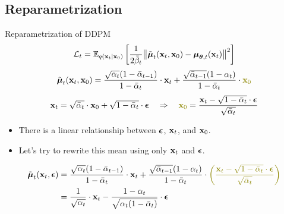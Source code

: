 \documentclass{beamer}
\begin{document}
\subsection{Reparametrization}
\begin{frame}{Reparametrization of DDPM}
    \[
        \mathcal{L}_t = \mathbb{E}_{q(\mathbf{x}_t | \mathbf{x}_0)} \left[\frac{1}{2\tilde{\beta}_t} \bigl\| \tilde{\boldsymbol{\mu}}_t(\mathbf{x}_t, \mathbf{x}_0) - \boldsymbol{\mu}_{\boldsymbol{\theta}, t}(\mathbf{x}_t) \bigr\|^2  \right]
    \]
    \[
        \tilde{\bmu}_t(\bx_t, \bx_0) = \frac{\sqrt{\alpha_t}(1 - \bar{\alpha}_{t-1})}{1 - \bar{\alpha}_t} \cdot \bx_t + \frac{\sqrt{\bar{\alpha}_{t-1}}(1 - \alpha_t)}{1 - \bar{\alpha}_t} \cdot {\color{olive} \bx_0}
    \]
    \vspace{-0.2cm}
    \[
        \bx_t = \sqrt{\bar{\alpha}_t} \cdot \bx_0 + \sqrt{1 - \bar{\alpha}_t} \cdot \bepsilon \quad \Rightarrow \quad {\color{olive} \bx_0} = \frac{\bx_t -  \sqrt{1 - \bar{\alpha}_t} \cdot \bepsilon}{\sqrt{\bar{\alpha}_t}}
    \]
    \vspace{-0.3cm}
    \begin{itemize}
    \item There is a linear relationship between $\boldsymbol{\epsilon}$, $\mathbf{x}_t$, and $\mathbf{x}_0$.
    \item Let's try to rewrite this mean using only $\mathbf{x}_t$ and $\boldsymbol{\epsilon}$.
    \end{itemize}
    \vspace{-0.2cm}
    \begin{align*}
        \tilde{\bmu}_t(\bx_t, \bepsilon) &= \frac{\sqrt{\alpha_t}(1 - \bar{\alpha}_{t-1})}{1 - \bar{\alpha}_t} \cdot \bx_t + \frac{\sqrt{\bar{\alpha}_{t-1}}(1 - \alpha_t)}{1 - \bar{\alpha}_t} \cdot {\color{olive} \left(\frac{\bx_t -  \sqrt{1 - \bar{\alpha}_t} \cdot \bepsilon}{\sqrt{\bar{\alpha}_t}}\right)} \\
        &= \frac{1}{\sqrt{\alpha_t}} \cdot \bx_t - \frac{1 - \alpha_t}{\sqrt{\alpha_t (1 - \bar{\alpha}_t)}} \cdot \bepsilon
    \end{align*}
\end{frame}
\end{document}
